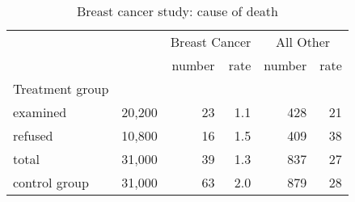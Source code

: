 \documentclass[landscape]{exam}
\begin{document}
  \begin{table}
    \centering
    \begin{tabular}{lrrrrr}
      & & \multicolumn{2}{c}{Breast Cancer} & \multicolumn{2}{c}{All Other} \\
                               \cmidrule(r){3-4} \cmidrule(r){5-6}    
                      &        & number & rate & number & rate \\
      Treatment group \\
      examined        & 20,200 & 23     & 1.1  & 428    & 21 \\
      refused         & 10,800 & 16     & 1.5  & 409    & 38 \\
      total           & 31,000 & 39     & 1.3  & 837    & 27 \\
    \midrule
      control group   & 31,000 & 63     & 2.0  & 879    & 28 \\
    \end{tabular}
    \caption{Breast cancer study: cause of death}\label{tab:breast.cancer}
  \end{table}
\end{document}
